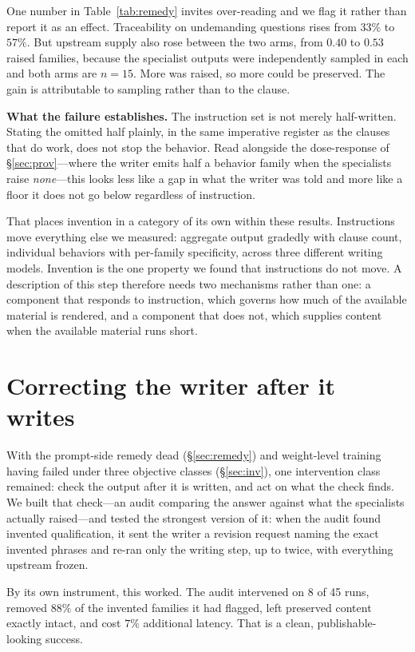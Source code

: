 \documentclass[11pt]{article}
\begin{document}
One number in Table~\ref{tab:remedy} invites over-reading and we flag it
rather than report it as an effect. Traceability on undemanding questions
rises from $33\%$ to $57\%$. But upstream supply also rose between the two
arms, from $0.40$ to $0.53$ raised families, because the specialist outputs
were independently sampled in each and both arms are $n{=}15$. More was
raised, so more could be preserved. The gain is attributable to sampling
rather than to the clause.

\textbf{What the failure establishes.} The instruction set is not merely
half-written. Stating the omitted half plainly, in the same imperative
register as the clauses that do work, does not stop the behavior. Read
alongside the dose-response of \S\ref{sec:prov}---where the writer emits half
a behavior family when the specialists raise \emph{none}---this looks less
like a gap in what the writer was told and more like a floor it does not go
below regardless of instruction.

That places invention in a category of its own within these results.
Instructions move everything else we measured: aggregate output gradedly with
clause count, individual behaviors with per-family specificity, across three
different writing models. Invention is the one property we found that
instructions do not move. A description of this step therefore needs two
mechanisms rather than one: a component that responds to instruction, which
governs how much of the available material is rendered, and a component that
does not, which supplies content when the available material runs short.


\section{Correcting the writer after it writes}
\label{sec:gate}
With the prompt-side remedy dead (\S\ref{sec:remedy}) and weight-level
training having failed under three objective classes (\S\ref{sec:inv}), one
intervention class remained: check the output after it is written, and act on
what the check finds. We built that check---an audit comparing the answer
against what the specialists actually raised---and tested the strongest
version of it: when the audit found invented qualification, it sent the
writer a revision request naming the exact invented phrases and re-ran only
the writing step, up to twice, with everything upstream frozen.

By its own instrument, this worked. The audit intervened on 8 of 45 runs,
removed $88\%$ of the invented families it had flagged, left preserved
content exactly intact, and cost $7\%$ additional latency. That is a clean,
publishable-looking success.
\end{document}
